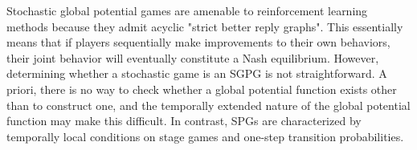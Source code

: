 Stochastic global potential games are amenable to reinforcement learning methods because they admit acyclic "strict better reply graphs". This essentially means that if players sequentially make improvements to their own behaviors, their joint behavior will eventually constitute a Nash equilibrium. However, determining whether a stochastic game is an SGPG is not straightforward. A priori, there is no way to check whether a global potential function exists other than to construct one, and the temporally extended nature of the global potential function may make this difficult. In contrast, SPGs are characterized by temporally local conditions on stage games and one-step transition probabilities.
